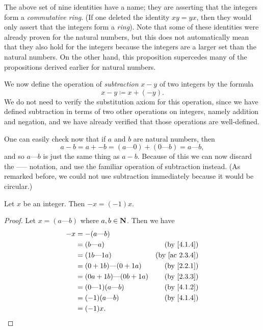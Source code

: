 \begin{remark}\label{4.1.7}
  The above set of nine identities have a name; they are asserting that the integers form a \emph{commutative ring}.
  (If one deleted the identity \(xy = yx\), then they would only assert that the integers form a \emph{ring}).
  Note that some of these identities were already proven for the natural numbers, but this does not automatically mean that they also hold for the integers because the integers are a larger set than the natural numbers.
  On the other hand, this proposition supercedes many of the propositions derived earlier for natural numbers.
\end{remark}

\begin{note}
  We now define the operation of \emph{subtraction} \(x - y\) of two integers by the formula
  \[
    x - y \coloneqq x + (-y).
  \]
  We do not need to verify the substitution axiom for this operation, since we have defined subtraction in terms of two other operations on integers, namely addition and negation, and we have already verified that those operations are well-defined.
\end{note}

\begin{note}
  One can easily check now that if \(a\) and \(b\) are natural numbers, then
  \[
    a - b = a + -b = (a \text{---} 0) + (0 \text{---} b) = a \text{---} b,
  \]
  and so \(a \text{---} b\) is just the same thing as \(a - b\).
  Because of this we can now discard the ----- notation, and use the familiar operation of subtraction instead.
  (As remarked before, we could not use subtraction immediately because it would be circular.)
\end{note}

\begin{additional corollary}\label{ac 4.1.3}
Let \(x\) be an integer.
Then \(-x = (-1)x\).
\end{additional corollary}

\begin{proof}
  Let \(x = (a \text{---} b)\) where \(a, b \in \mathbf{N}\).
  Then we have
  \begin{align*}
    -x & = -(a \text{---} b)                                              \\
       & = (b \text{---} a)                 & \text{(by \cref{4.1.4})}    \\
       & = (1b \text{---} 1a)               & \text{(by \cref{ac 2.3.4})} \\
       & = (0 + 1b) \text{---} (0 + 1a)     & \text{(by \cref{2.2.1})}    \\
       & = (0a + 1b) \text{---} (0b + 1a)   & \text{(by \cref{2.3.3})}    \\
       & = (0 \text{---} 1)(a \text{---} b) & \text{(by \cref{4.1.2})}    \\
       & = (-1)(a \text{---} b)             & \text{(by \cref{4.1.4})}    \\
       & = (-1)x.
  \end{align*}
\end{proof}


